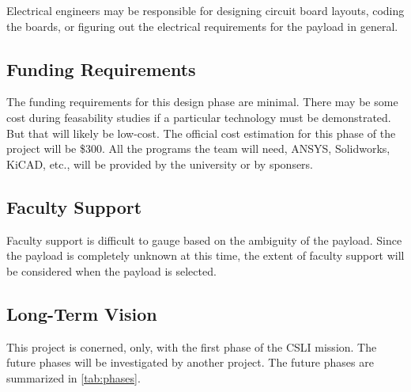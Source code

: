 \documentclass[conference]{IEEEtran} %
\begin{document}
Electrical engineers may be responsible for designing circuit board layouts, coding the boards, or figuring out the electrical requirements for the payload in general.

\subsection{Funding Requirements}
The funding requirements for this design phase are minimal. There may be some cost during feasability studies if a particular technology must be demonstrated.
But that will likely be low-cost. The official cost estimation for this phase of the project will be \$300. All the programs the team will need, ANSYS, Solidworks, KiCAD, etc., will
be provided by the university or by sponsers.

\subsection{Faculty Support}
Faculty support is difficult to gauge based on the ambiguity of the payload. Since the payload is completely unknown at this time, the extent of faculty support will be considered when
the payload is selected.

\subsection{Long-Term Vision}
\label{sec:vision}
This project is conerned, only, with the first phase of the CSLI mission. The future phases will be investigated by another project. The future phases are
summarized in \autoref{tab:phases}.
\end{document}
